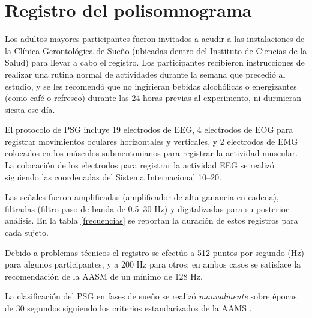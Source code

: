 
\section{Registro del polisomnograma}

Los adultos mayores participantes fueron invitados a acudir a las instalaciones de la Clínica 
Gerontológica de Sueño (ubicadas dentro del Instituto de Ciencias de la Salud) para llevar a cabo 
el registro. Los participantes recibieron instrucciones de realizar una rutina normal de 
actividades durante la semana que precedió al estudio, y se les recomendó que no ingirieran bebidas 
alcohólicas o energizantes (como café o refresco) durante las 24 horas previas al experimento, ni 
durmieran siesta ese día.

El protocolo de PSG incluye 19 electrodos de EEG, 4 electrodos de EOG para registrar movimientos 
oculares horizontales y verticales, y 2 electrodos de EMG colocados en los músculos submentonianos 
para registrar la actividad muscular. 
La colocación de los electrodos para registrar la actividad EEG se realizó siguiendo las 
coordenadas del Sistema Internacional 10--20.

Las señales fueron amplificadas (amplificador de alta ganancia en cadena), filtradas (filtro paso 
de banda de 0.5--30 Hz) y digitalizadas para su posterior análisis.
En la tabla \ref{frecuencias} se reportan la duración de estos registros para cada sujeto.

Debido a problemas técnicos el registro se efectúo a 512 puntos por segundo (Hz) para algunos
participantes, y a 200 Hz para otros; en ambos casos se satisface la recomendación de la AASM de un 
mínimo de 128 Hz. 

La clasificación del PSG en fases de sueño se realizó \textit{manualmente} sobre épocas de 30 
segundos siguiendo los criterios estandarizados de la AAMS \cite{Hori01}.


